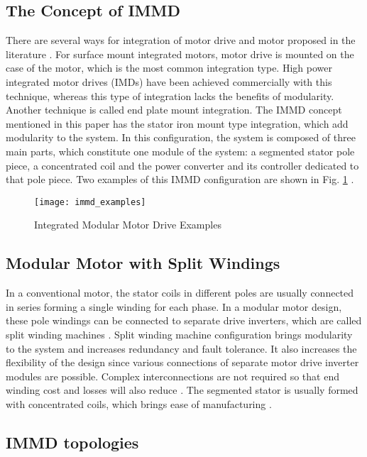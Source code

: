 \documentclass[conference,a4paper,twocolumn]{IEEEtran}
\begin{document}
\subsection{The Concept of IMMD}

There are several ways for integration of motor drive and motor proposed in the literature \cite{LoCalzo2016,Wolmarans2008}. For surface mount integrated motors, motor drive is mounted on the case of the motor, which is the most common integration type. High power integrated motor drives (IMDs) have been achieved commercially with this technique, whereas this type of integration lacks the benefits of modularity. Another technique is called end plate mount integration.
The IMMD concept mentioned in this paper has the stator iron mount type integration, which add modularity to the system. In this configuration, the system is composed of three main parts, which constitute one module of the system: a segmented stator pole piece, a concentrated coil and the power converter and its controller dedicated to that pole piece. Two examples of this IMMD configuration are shown in Fig. \ref{fig1} \cite{LoCalzo2016,Wang2015}.


\begin{figure}[h]
  \centering
  \texttt{[image: immd\_examples]}
  \caption{Integrated Modular Motor Drive Examples}
  \label{fig1}
\end{figure}

\subsection{Modular Motor with Split Windings}

In a conventional motor, the stator coils in different poles are usually connected in series forming a single winding for each phase. In a modular motor design, these pole windings can be connected to separate drive inverters, which are called split winding machines \cite{Galassini2015,Wang2013,Wang2015}. Split winding machine configuration brings modularity to the system and increases redundancy and fault tolerance. It also increases the flexibility of the design since various connections of separate motor drive inverter modules are possible. Complex interconnections are not required so that end winding cost and losses will also reduce \cite{Wang2015}. The segmented stator is usually formed with concentrated coils, which brings ease of manufacturing \cite{Lambert2015a}.


\subsection{IMMD topologies}
\end{document}
